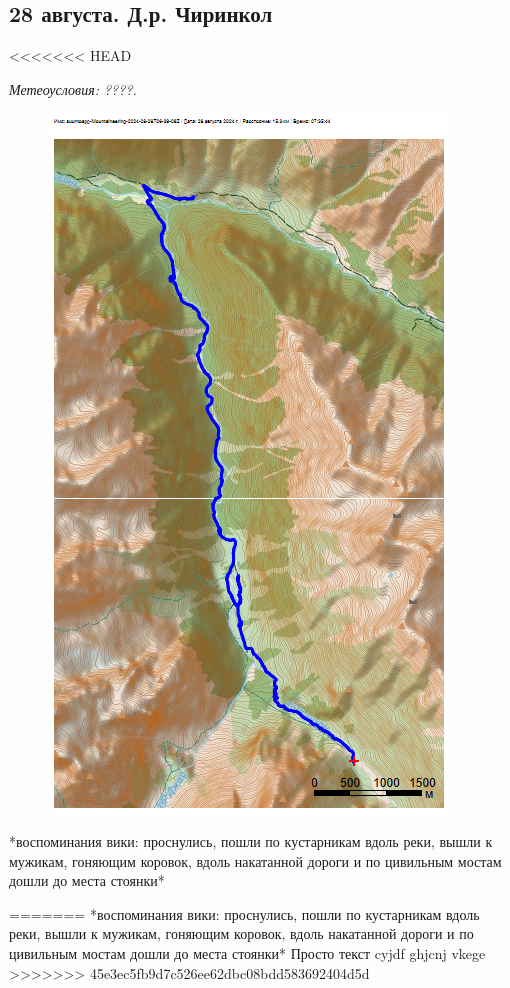 \subsection{28 августа. Д.р. Чиринкол}
<<<<<<< HEAD

\textit{Метеоусловия: ????.}

\begin{figure}[h!]
	\centering
	\includegraphics[angle=0, width=0.3\linewidth]{../pics/mini_maps/28}
	\label{fig:mini_28}
\end{figure}

*воспоминания вики: проснулись, пошли по кустарникам вдоль реки, вышли к мужикам, гоняющим коровок, вдоль накатанной дороги и по цивильным мостам дошли до места стоянки*

=======
*воспоминания вики: проснулись, пошли по кустарникам вдоль реки, вышли к мужикам, гоняющим коровок, вдоль накатанной дороги и по цивильным мостам дошли до места стоянки*
Просто текст cyjdf ghjcnj vkege
>>>>>>> 45e3ec5fb9d7c526ee62dbc08bdd583692404d5d
\newpage